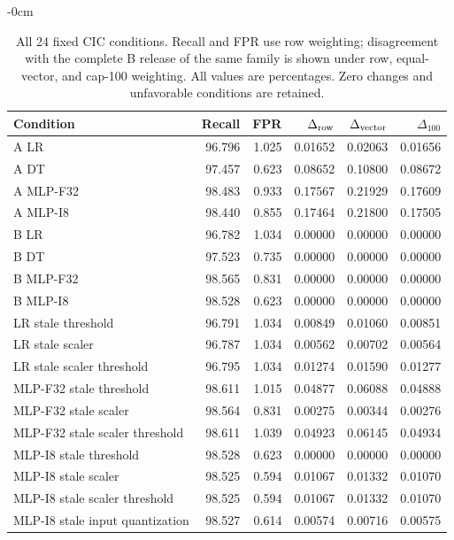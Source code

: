 \begin{table}[!htbp]
\begin{adjustwidth}{-\extralength}{0cm}
\color{RevisionBlue}
\captionsetup{font+=revisionblue}
\caption{All 24 fixed CIC conditions. Recall and FPR use row weighting; disagreement with the complete B release of the same family is shown under row, equal-vector, and cap-100 weighting. All values are percentages. Zero changes and unfavorable conditions are retained.}\label{tab:cic-all}
\centering\footnotesize\setlength{\tabcolsep}{4pt}
\begin{tabular}{lrrrrr}
\toprule Condition & Recall & FPR & $\Delta_{\rm row}$ & $\Delta_{\rm vector}$ & $\Delta_{100}$\\
\midrule
A LR & 96.796 & 1.025 & 0.01652 & 0.02063 & 0.01656\\
A DT & 97.457 & 0.623 & 0.08652 & 0.10800 & 0.08672\\
A MLP-F32 & 98.483 & 0.933 & 0.17567 & 0.21929 & 0.17609\\
A MLP-I8 & 98.440 & 0.855 & 0.17464 & 0.21800 & 0.17505\\
B LR & 96.782 & 1.034 & 0.00000 & 0.00000 & 0.00000\\
B DT & 97.523 & 0.735 & 0.00000 & 0.00000 & 0.00000\\
B MLP-F32 & 98.565 & 0.831 & 0.00000 & 0.00000 & 0.00000\\
B MLP-I8 & 98.528 & 0.623 & 0.00000 & 0.00000 & 0.00000\\
LR stale threshold & 96.791 & 1.034 & 0.00849 & 0.01060 & 0.00851\\
LR stale scaler & 96.787 & 1.034 & 0.00562 & 0.00702 & 0.00564\\
LR stale scaler threshold & 96.795 & 1.034 & 0.01274 & 0.01590 & 0.01277\\
MLP-F32 stale threshold & 98.611 & 1.015 & 0.04877 & 0.06088 & 0.04888\\
MLP-F32 stale scaler & 98.564 & 0.831 & 0.00275 & 0.00344 & 0.00276\\
MLP-F32 stale scaler threshold & 98.611 & 1.039 & 0.04923 & 0.06145 & 0.04934\\
MLP-I8 stale threshold & 98.528 & 0.623 & 0.00000 & 0.00000 & 0.00000\\
MLP-I8 stale scaler & 98.525 & 0.594 & 0.01067 & 0.01332 & 0.01070\\
MLP-I8 stale scaler threshold & 98.525 & 0.594 & 0.01067 & 0.01332 & 0.01070\\
MLP-I8 stale input quantization & 98.527 & 0.614 & 0.00574 & 0.00716 & 0.00575\\

\end{tabular}
\end{adjustwidth}
\end{table}

